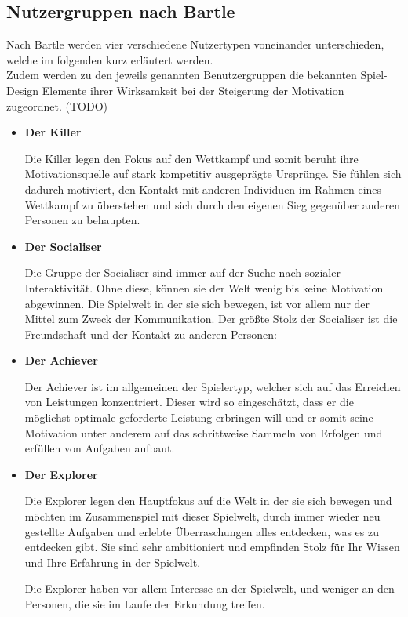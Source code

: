 \documentclass{scrreprt}
\begin{document}
\subsection{Nutzergruppen nach Bartle} \label{sub:nutzergruppenBartle}
\par Nach Bartle \citep{bartle1996hearts} werden vier verschiedene Nutzertypen voneinander unterschieden, welche im folgenden kurz erläutert werden.\\
Zudem werden zu den jeweils genannten Benutzergruppen die bekannten Spiel-Design Elemente ihrer Wirksamkeit bei der Steigerung der Motivation zugeordnet. (TODO)

\begin{itemize}
\item \textbf{Der Killer}
\par Die Killer legen den Fokus auf den Wettkampf und somit beruht ihre Motivationsquelle auf stark kompetitiv ausgeprägte Ursprünge. Sie fühlen sich dadurch motiviert, den Kontakt mit anderen Individuen im Rahmen eines Wettkampf zu überstehen und sich durch den eigenen Sieg gegenüber anderen Personen zu behaupten.

\item \textbf{Der Socialiser}
\par Die Gruppe der Socialiser sind immer auf der Suche nach sozialer Interaktivität. Ohne diese, können sie der Welt wenig bis keine Motivation abgewinnen. Die Spielwelt in der sie sich bewegen, ist vor allem nur der Mittel zum Zweck der Kommunikation. Der größte Stolz der Socialiser ist die Freundschaft und der Kontakt zu anderen Personen:

\item \textbf{Der Achiever}
\par Der Achiever ist im allgemeinen der Spielertyp, welcher sich auf das Erreichen von Leistungen konzentriert. Dieser wird so eingeschätzt, dass er die möglichst optimale geforderte Leistung erbringen will und er somit seine Motivation unter anderem auf das schrittweise Sammeln von Erfolgen und erfüllen von Aufgaben aufbaut.

\item \textbf{Der Explorer}
\par Die Explorer legen den Hauptfokus auf die Welt in der sie sich bewegen und möchten im Zusammenspiel mit dieser Spielwelt, durch immer wieder neu gestellte Aufgaben und erlebte Überraschungen alles entdecken, was es zu entdecken gibt. Sie sind sehr ambitioniert und empfinden Stolz für Ihr Wissen und Ihre Erfahrung in der Spielwelt. 
\par Die Explorer haben vor allem Interesse an der Spielwelt, und weniger an den Personen, die sie im Laufe der Erkundung treffen.
\end{itemize}
\end{document}
